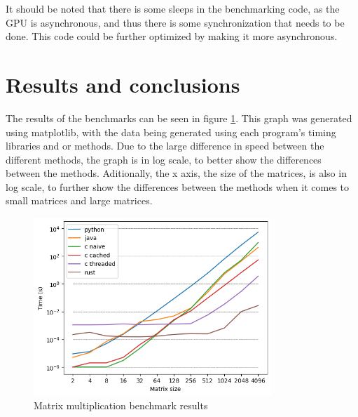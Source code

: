 \documentclass{article}
\begin{document}
It should be noted that
there is some sleeps in the benchmarking code, as the GPU is asynchronous,
and thus there is some synchronization that needs to be done.
This code could be further optimized by making it more asynchronous.

\section{Results and conclusions}

The results of the benchmarks can be seen in figure \ref{fig:results}.
This graph was generated using matplotlib, with the data being generated
using each program's timing libraries and or methods.
Due to the large difference in speed between the different methods,
the graph is in log scale, to better show the differences between the methods.
Aditionally, the x axis, the size of the matrices, is also in log scale,
to further show the differences between the methods when it comes to
small matrices and large matrices.

\begin{figure}[h!]
	\centering
	\includegraphics[width=0.8\textwidth]{results.png}
	\caption{Matrix multiplication benchmark results}
	\label{fig:results}
\end{figure}
\end{document}
